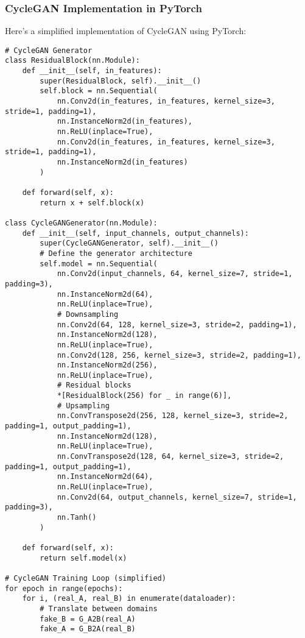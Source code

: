 \subsubsection{CycleGAN Implementation in PyTorch}
Here's a simplified implementation of CycleGAN using PyTorch:

\begin{lstlisting}[style=python]
# CycleGAN Generator
class ResidualBlock(nn.Module):
    def __init__(self, in_features):
        super(ResidualBlock, self).__init__()
        self.block = nn.Sequential(
            nn.Conv2d(in_features, in_features, kernel_size=3, stride=1, padding=1),
            nn.InstanceNorm2d(in_features),
            nn.ReLU(inplace=True),
            nn.Conv2d(in_features, in_features, kernel_size=3, stride=1, padding=1),
            nn.InstanceNorm2d(in_features)
        )
    
    def forward(self, x):
        return x + self.block(x)

class CycleGANGenerator(nn.Module):
    def __init__(self, input_channels, output_channels):
        super(CycleGANGenerator, self).__init__()
        # Define the generator architecture
        self.model = nn.Sequential(
            nn.Conv2d(input_channels, 64, kernel_size=7, stride=1, padding=3),
            nn.InstanceNorm2d(64),
            nn.ReLU(inplace=True),
            # Downsampling
            nn.Conv2d(64, 128, kernel_size=3, stride=2, padding=1),
            nn.InstanceNorm2d(128),
            nn.ReLU(inplace=True),
            nn.Conv2d(128, 256, kernel_size=3, stride=2, padding=1),
            nn.InstanceNorm2d(256),
            nn.ReLU(inplace=True),
            # Residual blocks
            *[ResidualBlock(256) for _ in range(6)],
            # Upsampling
            nn.ConvTranspose2d(256, 128, kernel_size=3, stride=2, padding=1, output_padding=1),
            nn.InstanceNorm2d(128),
            nn.ReLU(inplace=True),
            nn.ConvTranspose2d(128, 64, kernel_size=3, stride=2, padding=1, output_padding=1),
            nn.InstanceNorm2d(64),
            nn.ReLU(inplace=True),
            nn.Conv2d(64, output_channels, kernel_size=7, stride=1, padding=3),
            nn.Tanh()
        )
    
    def forward(self, x):
        return self.model(x)

# CycleGAN Training Loop (simplified)
for epoch in range(epochs):
    for i, (real_A, real_B) in enumerate(dataloader):
        # Translate between domains
        fake_B = G_A2B(real_A)
        fake_A = G_B2A(real_B)


\end{lstlisting}
